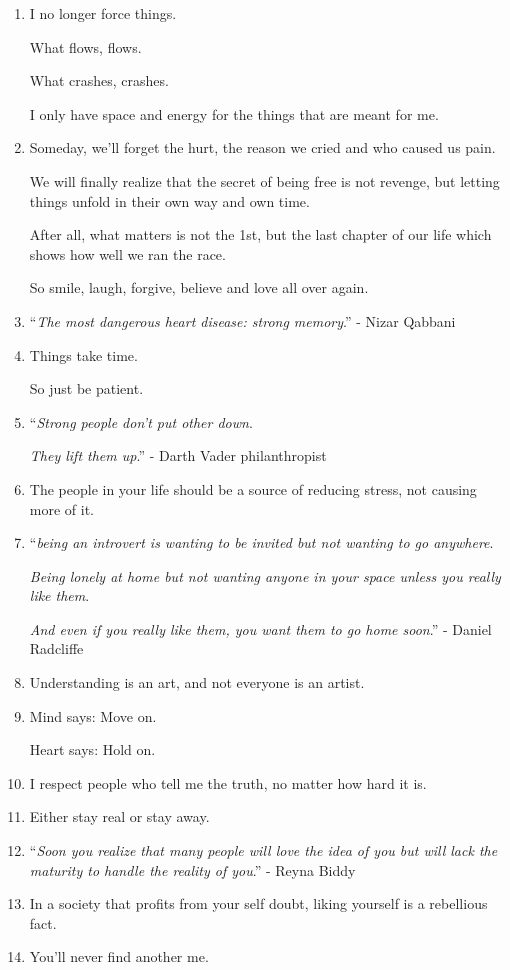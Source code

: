\documentclass{article}
\numberwithin{equation}{section}
\begin{document}
\begin{enumerate}
    Most irritating thing.
    \item I no longer force things.
    
    What flows, flows.
    
    What crashes, crashes.
    
    I only have space and energy for the things that are meant for me.
    \item Someday, we'll forget the hurt, the reason we cried and who caused us pain.
    
    We will finally realize that the secret of being free is not revenge, but letting things unfold in their own way and own time.
    
    After all, what matters is not the 1st, but the last chapter of our life which shows how well we ran the race.
    
    So smile, laugh, forgive, believe and love all over again.
    \item ``\textit{The most dangerous heart disease: strong memory}.'' - Nizar Qabbani
    \item Things take time.
    
    So just be patient.
    \item ``\textit{Strong people don't put other down}.
    
    \textit{They lift them up}.'' - Darth Vader philanthropist
    \item The people in your life should be a source of reducing stress, not causing more of it.
    \item ``\textit{being an introvert is wanting to be invited but not wanting to go anywhere}.
    
    \textit{Being lonely at home but not wanting anyone in your space unless you really like them}.
    
    \textit{And even if you really like them, you want them to go home soon}.'' - Daniel Radcliffe
    \item Understanding is an art, and not everyone is an artist.
    \item Mind says: Move on.
    
    Heart says: Hold on.
    \item I respect people who tell me the truth, no matter how hard it is.
    \item Either stay real or stay away.
    \item ``\textit{Soon you realize that many people will love the idea of you but will lack the maturity to handle the reality of you}.'' - Reyna Biddy
    \item In a society that profits from your self doubt, liking yourself is a rebellious fact.
    \item You'll never find another me.
    

\end{enumerate}
\end{document}
